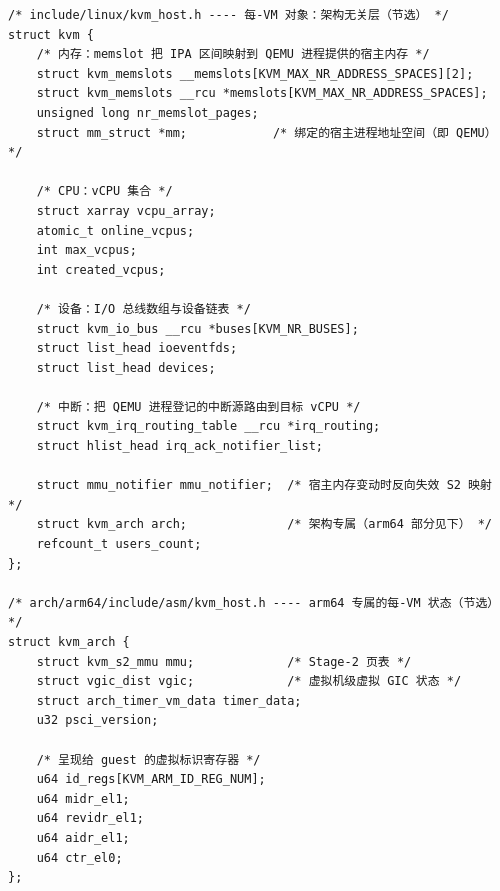 \begin{lstlisting}[caption={KVM 每-VM 对象的组成：架构无关的 kvm 与 arm64 专属的 kvm\_arch（Linux 7.0，节选）},label={lst:kvm-vm}]
/* include/linux/kvm_host.h ---- 每-VM 对象：架构无关层（节选） */
struct kvm {
    /* 内存：memslot 把 IPA 区间映射到 QEMU 进程提供的宿主内存 */
    struct kvm_memslots __memslots[KVM_MAX_NR_ADDRESS_SPACES][2];
    struct kvm_memslots __rcu *memslots[KVM_MAX_NR_ADDRESS_SPACES];
    unsigned long nr_memslot_pages;
    struct mm_struct *mm;            /* 绑定的宿主进程地址空间（即 QEMU） */

    /* CPU：vCPU 集合 */
    struct xarray vcpu_array;
    atomic_t online_vcpus;
    int max_vcpus;
    int created_vcpus;

    /* 设备：I/O 总线数组与设备链表 */
    struct kvm_io_bus __rcu *buses[KVM_NR_BUSES];
    struct list_head ioeventfds;
    struct list_head devices;

    /* 中断：把 QEMU 进程登记的中断源路由到目标 vCPU */
    struct kvm_irq_routing_table __rcu *irq_routing;
    struct hlist_head irq_ack_notifier_list;

    struct mmu_notifier mmu_notifier;  /* 宿主内存变动时反向失效 S2 映射 */
    struct kvm_arch arch;              /* 架构专属（arm64 部分见下） */
    refcount_t users_count;
};

/* arch/arm64/include/asm/kvm_host.h ---- arm64 专属的每-VM 状态（节选） */
struct kvm_arch {
    struct kvm_s2_mmu mmu;             /* Stage-2 页表 */
    struct vgic_dist vgic;             /* 虚拟机级虚拟 GIC 状态 */
    struct arch_timer_vm_data timer_data;
    u32 psci_version;

    /* 呈现给 guest 的虚拟标识寄存器 */
    u64 id_regs[KVM_ARM_ID_REG_NUM];
    u64 midr_el1;
    u64 revidr_el1;
    u64 aidr_el1;
    u64 ctr_el0;
};
\end{lstlisting}


